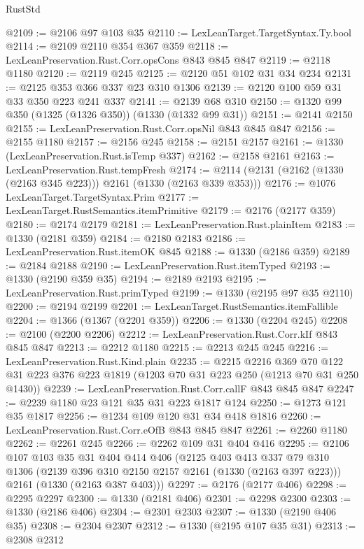 \begin{lexlean}{RustStd}
\begin{coremodule}
@2109 := @2106 @97 @103 @35
@2110 := LexLeanTarget.TargetSyntax.Ty.bool
@2114 := @2109 @2110 @354 @367 @359
@2118 := LexLeanPreservation.Rust.Corr.opsCons @843 @845 @847
@2119 := @2118 @1180
@2120 := @2119 @245
@2125 := @2120 @51 @102 @31 @34 @234
@2131 := @2125 @353 @366 @337 @23 @310 @1306
@2139 := @2120 @100 @59 @31 @33 @350 @223 @241 @337
@2141 := @2139 @68 @310
@2150 := @1320 @99 @350 (@1325 (@1326 @350)) (@1330 (@1332 @99 @31))
@2151 := @2141 @2150
@2155 := LexLeanPreservation.Rust.Corr.opsNil @843 @845 @847
@2156 := @2155 @1180
@2157 := @2156 @245
@2158 := @2151 @2157
@2161 := @1330 (LexLeanPreservation.Rust.isTemp @337)
@2162 := @2158 @2161
@2163 := LexLeanPreservation.Rust.tempFresh
@2174 := @2114 (@2131 (@2162 (@1330 (@2163 @345 @223))) @2161 (@1330 (@2163 @339 @353)))
@2176 := @1076 LexLeanTarget.TargetSyntax.Prim
@2177 := LexLeanTarget.RustSemantics.itemPrimitive
@2179 := @2176 (@2177 @359)
@2180 := @2174 @2179
@2181 := LexLeanPreservation.Rust.plainItem
@2183 := @1330 (@2181 @359)
@2184 := @2180 @2183
@2186 := LexLeanPreservation.Rust.itemOK @845
@2188 := @1330 (@2186 @359)
@2189 := @2184 @2188
@2190 := LexLeanPreservation.Rust.itemTyped
@2193 := @1330 (@2190 @359 @35)
@2194 := @2189 @2193
@2195 := LexLeanPreservation.Rust.primTyped
@2199 := @1330 (@2195 @97 @35 @2110)
@2200 := @2194 @2199
@2201 := LexLeanTarget.RustSemantics.itemFallible
@2204 := @1366 (@1367 (@2201 @359))
@2206 := @1330 (@2204 @245)
@2208 := @2100 (@2200 @2206)
@2212 := LexLeanPreservation.Rust.Corr.kIf @843 @845 @847
@2213 := @2212 @1180
@2215 := @2213 @245 @245
@2216 := LexLeanPreservation.Rust.Kind.plain
@2235 := @2215
    @2216
    @369
    @70
    @122
    @31
    @223
    @376
    @223
    @1819
    (@1203 @70 @31 @223 @250 (@1213 @70 @31 @250 @1430))
@2239 := LexLeanPreservation.Rust.Corr.callF @843 @845 @847
@2247 := @2239 @1180 @23 @121 @35 @31 @223 @1817 @124
@2250 := @1273 @121 @35 @1817
@2256 := @1234 @109 @120 @31 @34 @418 @1816
@2260 := LexLeanPreservation.Rust.Corr.eOfB @843 @845 @847
@2261 := @2260 @1180
@2262 := @2261 @245
@2266 := @2262 @109 @31 @404 @416
@2295 := @2106
    @107
    @103
    @35
    @31
    @404
    @414
    @406
    (@2125
      @403
      @413
      @337
      @79
      @310
      @1306
      (@2139 @396 @310 @2150 @2157 @2161 (@1330 (@2163 @397 @223)))
      @2161
      (@1330 (@2163 @387 @403)))
@2297 := @2176 (@2177 @406)
@2298 := @2295 @2297
@2300 := @1330 (@2181 @406)
@2301 := @2298 @2300
@2303 := @1330 (@2186 @406)
@2304 := @2301 @2303
@2307 := @1330 (@2190 @406 @35)
@2308 := @2304 @2307
@2312 := @1330 (@2195 @107 @35 @31)
@2313 := @2308 @2312

\end{coremodule}
\end{lexlean}
